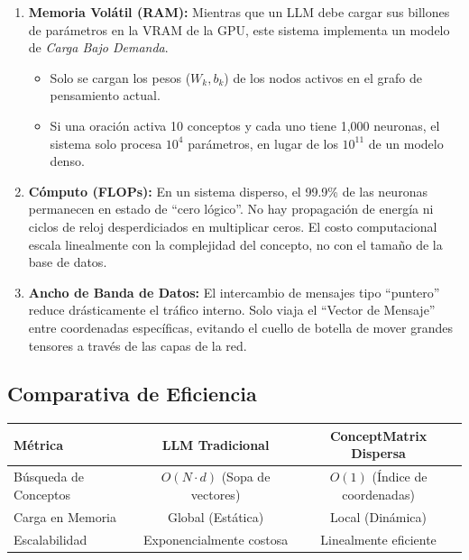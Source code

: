 \documentclass[12pt]{article}
\begin{document}
\begin{enumerate}
    \item \textbf{Memoria Volátil (RAM):} Mientras que un LLM debe cargar sus billones de parámetros en la VRAM de la GPU, este sistema implementa un modelo de \textit{Carga Bajo Demanda}.
    \begin{itemize}
        \item Solo se cargan los pesos ($W_k, b_k$) de los nodos activos en el grafo de pensamiento actual.
        \item Si una oración activa 10 conceptos y cada uno tiene 1,000 neuronas, el sistema solo procesa $10^4$ parámetros, en lugar de los $10^{11}$ de un modelo denso.
    \end{itemize}
    
    \item \textbf{Cómputo (FLOPs):} En un sistema disperso, el 99.9\% de las neuronas permanecen en estado de ``cero lógico''. No hay propagación de energía ni ciclos de reloj desperdiciados en multiplicar ceros. El costo computacional escala linealmente con la complejidad del concepto, no con el tamaño de la base de datos.

    \item \textbf{Ancho de Banda de Datos:} El intercambio de mensajes tipo ``puntero'' reduce drásticamente el tráfico interno. Solo viaja el ``Vector de Mensaje'' entre coordenadas específicas, evitando el cuello de botella de mover grandes tensores a través de las capas de la red.
\end{enumerate}



\subsection{Comparativa de Eficiencia}
\begin{center}
\begin{tabular}{|l|c|c|}
\hline
\textbf{Métrica} & \textbf{LLM Tradicional} & \textbf{ConceptMatrix Dispersa} \\ \hline
Búsqueda de Conceptos & $O(N \cdot d)$ (Sopa de vectores) & $O(1)$ (Índice de coordenadas) \\ \hline
Carga en Memoria & Global (Estática) & Local (Dinámica) \\ \hline
Escalabilidad & Exponencialmente costosa & Linealmente eficiente \\ \hline
\end{tabular}
\end{center}
\end{document}
